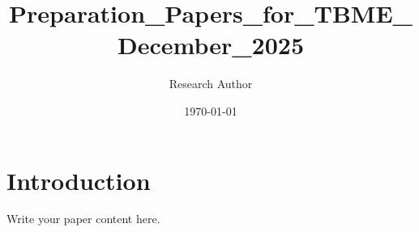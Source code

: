 \documentclass{article}
\title{Preparation_Papers_for_TBME_December_2025}
\author{Research Author}
\date{\today}
\begin{document}
\maketitle

\section{Introduction}
Write your paper content here.
\end{document}
